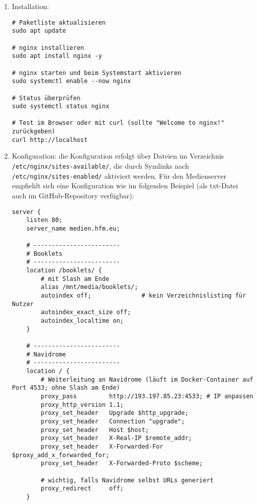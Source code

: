 \documentclass[12pt,a4paper]{report}
\begin{document}
  \begin{enumerate}
    \item Installation:
    \begin{verbatim}
# Paketliste aktualisieren
sudo apt update

# nginx installieren
sudo apt install nginx -y

# nginx starten und beim Systemstart aktivieren
sudo systemctl enable --now nginx

# Status überprüfen
sudo systemctl status nginx

# Test im Browser oder mit curl (sollte "Welcome to nginx!" zurückgeben)
curl http://localhost
    \end{verbatim} 

    \item Konfiguration:
    die Konfiguration erfolgt über Dateien im Verzeichnis \texttt{/etc/nginx/sites-available/}, 
    die durch Symlinks nach\\ \texttt{/etc/nginx/sites-enabled/} aktiviert werden.  
    Für den Medienserver empfiehlt sich eine Konfiguration wie im folgenden Beispiel (als txt-Datei auch im     GitHub-Repository verfügbar):  

    \begin{verbatim}
server {
    listen 80;
    server_name medien.hfm.eu;

    # ------------------------
    # Booklets
    # ------------------------
    location /booklets/ {
        # mit Slash am Ende
        alias /mnt/media/booklets/;
        autoindex off;              # kein Verzeichnislisting für Nutzer
        autoindex_exact_size off;
        autoindex_localtime on;
    }

    # ------------------------
    # Navidrome
    # ------------------------
    location / {
        # Weiterleitung an Navidrome (läuft im Docker-Container auf Port 4533; ohne Slash am Ende)
        proxy_pass         http://193.197.85.23:4533; # IP anpassen
        proxy_http_version 1.1;
        proxy_set_header   Upgrade $http_upgrade;
        proxy_set_header   Connection "upgrade";
        proxy_set_header   Host $host;
        proxy_set_header   X-Real-IP $remote_addr;
        proxy_set_header   X-Forwarded-For $proxy_add_x_forwarded_for;
        proxy_set_header   X-Forwarded-Proto $scheme;

        # wichtig, falls Navidrome selbst URLs generiert
        proxy_redirect     off;
    }


\end{verbatim}
\end{enumerate}
\end{document}
